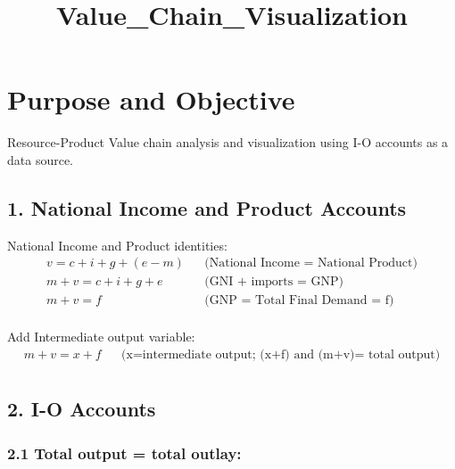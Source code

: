 \documentclass[
  letterpaper,
  DIV=11,
  numbers=noendperiod]{scrartcl}
\title{Value\_Chain\_Visualization}
\author{}
\date{}
\renewcommand*\contentsname{Table of contents}
\newcommand\contentsname{Table of contents}
\begin{document}
\maketitle
\ifdefined\Shaded\renewenvironment{Shaded}{\begin{tcolorbox}[borderline west={3pt}{0pt}{shadecolor}, frame hidden, sharp corners, breakable, interior hidden, boxrule=0pt, enhanced]}{\end{tcolorbox}}\fi

\renewcommand*\contentsname{Table of contents}
{
\hypersetup{linkcolor=}
\setcounter{tocdepth}{3}
\tableofcontents
}
\hypertarget{purpose-and-objective}{%
\section{Purpose and Objective}\label{purpose-and-objective}}

Resource-Product Value chain analysis and visualization using I-O
accounts as a data source.

\hypertarget{national-income-and-product-accounts}{%
\subsection{1. National Income and Product
Accounts}\label{national-income-and-product-accounts}}

National Income and Product identities: \[
\begin{align}
  v = c+i+g+(e-m)   && \text{(National Income = National Product)}\\
  m+v = c+i+g+e     && \text{(GNI + imports = GNP)}\\
  m+v = f     && \text{(GNP = Total Final Demand = f)}\\
\end{align}
\]

Add Intermediate output variable: \[
\begin{align}
  m+v = x+f     && \text{(x=intermediate output; (x+f) and (m+v)= total output)}\\
\end{align}
\]

\hypertarget{i-o-accounts}{%
\subsection{2. I-O Accounts}\label{i-o-accounts}}

\hypertarget{total-output-total-outlay}{%
\subsubsection{2.1 Total output = total
outlay:}\label{total-output-total-outlay}}
\end{document}
